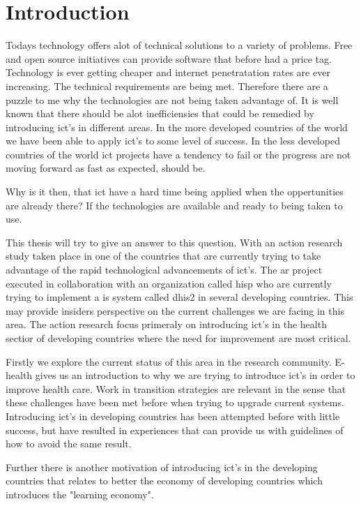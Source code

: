 \chapter{Introduction}

Todays technology offers alot of technical solutions to a variety of problems. 
Free and open source initiatives can provide software that before had a price tag.
Technology is ever getting cheaper and internet penetratation rates are ever increasing.
The technical requirements are being met. 
Therefore there are a puzzle to me why the technologies are not being taken advantage of.
It is well known that there should be alot inefficiensies that could be remedied by introducing \gls{ict}'s in different areas.
In the more developed countries of the world we have been able to apply \gls{ict}'s to some level of success.
In the less developed countries of the world \gls{ict} projects have a tendency to fail or the progress are not moving forward as fast as expected, should be.


Why is it then, that \gls{ict} have a hard time being applied when the oppertunities are already there?
If the technologies are available and ready to being taken to use. 

This thesis will try to give an answer to this question. 
With an action research study taken place in one of the countries that are currently trying to take advantage of the rapid technological advancements of \gls{ict}'s.
The \gls{ar} project executed in collaboration with an organization called \gls{hisp} who are currently trying to implement a \gls{is} system called \gls{dhis2} in several developing countries.
This may provide insiders perspective on the current challenges we are facing in this area. 
The action research focus primeraly on introducing \gls{ict}'s in the health sectior of developing countries where the need for improvement are most critical. 

Firstly we explore the current status of this area in the research community. 
E-health gives us an introduction to why we are trying to introduce \gls{ict}'s in order to improve health care. 
Work in transition strategies are relevant in the sense that these challenges have been met before when trying to upgrade current systems. 
Introducing \gls{ict}'s in developing countries has been attempted before with little success, but have resulted in experiences that can provide us with guidelines of how to avoid the same result. 

Further there is another motivation of introducing \gls{ict}'s in the developing countries that relates to better the economy of developing countries which introduces the "learning economy". 

